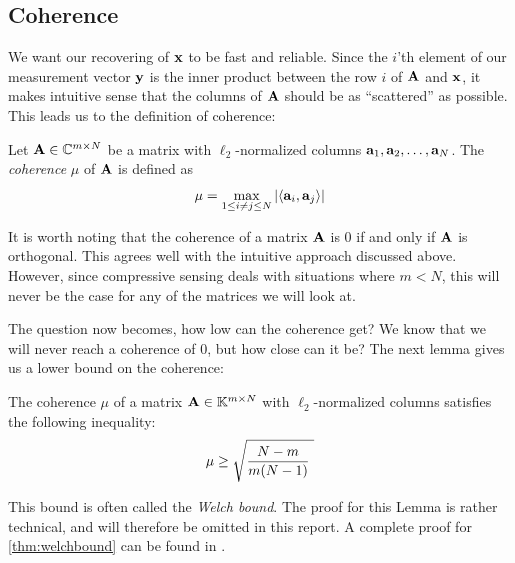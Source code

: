 \subsection{Coherence}
\label{sec:coherence}

We want our recovering of $ \mathbf{x} $ to be fast and reliable. Since the $ i $'th element of our measurement vector $ \mathbf{y} $ is the inner product between the row $ i $ of $ \mathbf{A} $ and $ \mathbf{x} $, it makes intuitive sense that the columns of $ \mathbf{A} $ should be as ``scattered'' as possible. This leads us to the definition of coherence: 

\begin{definition}
	Let $ \mathbf{A} \in \mathbb{C}^{m\times N} $ be a matrix with $ \ell_{2} $-normalized columns $ \mathbf{a}_{1}, \mathbf{a}_{2}, \ldots, \mathbf{a}_{N} $. The \textit{coherence} $ \mu $ of $ \mathbf{A} $ is defined as
	\[
		\mu = \max_{1\leq i \neq j \leq N} \left|\langle \mathbf{a}_{i} , \mathbf{a}_{j} \rangle\right|
	\]
\end{definition}

It is worth noting that the coherence of a matrix $ \mathbf{A} $ is $ 0 $ if and only if $ \mathbf{A} $ is orthogonal. This agrees well with the intuitive approach discussed above. However, since compressive sensing deals with situations where $ m < N $, this will never be the case for any of the matrices we will look at. 

The question now becomes, how low can the coherence get? We know that we will never reach a coherence of $ 0 $, but how close can it be? The next lemma gives us a lower bound on the coherence:

\begin{lemma} \label{thm:welchbound}
	The coherence $ \mu $ of a matrix $ \mathbf{A} \in \mathbb{K}^{m \times N} $ with $ \ell_{2} $-normalized columns satisfies the following inequality:
	\[
		\mu \geq \sqrt{\dfrac{N-m}{m(N-1)}~}
	\]
\end{lemma}

\noindent This bound is often called the \textit{Welch bound}. The proof for this Lemma is rather technical, and will therefore be omitted in this report. A complete proof for \cref{thm:welchbound} can be found in \cite[Theorem~5.7]{foucart13intro}.


